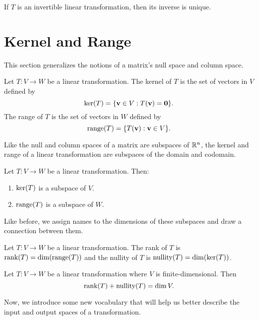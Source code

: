 \documentclass[../m73main.tex]{chapters}
\begin{document}
\begin{theorem}
	If $T$ is an invertible linear transformation, then its inverse is unique.
\end{theorem}

\section{Kernel and Range}
This section generalizes the notions of a matrix's null space and column space.

\begin{definition}
	Let $T : V \to W$ be a linear transformation.
	The kernel of $T$ is the set of vectors in $V$ defined by
	\[ \textrm{ker}(T) = \{\mathbf{v} \in V : T(\mathbf{v}) = \mathbf{0}\}. \]
	The range of $T$ is the set of vectors in $W$ defined by
	\[ \textrm{range}(T) = \{T(\mathbf{v}) : \mathbf{v} \in V\}. \]
\end{definition}

Like the null and column spaces of a matrix are subspaces of $\mathbb{R}^n$, the kernel and range of a linear transformation are subspaces of the domain and codomain.

\begin{theorem}
	Let $T : V \to W$ be a linear transformation.
	Then:
	\begin{enumerate}[label=(\alph*)]
		\item $\textrm{ker}(T)$ is a subspace of $V$.
		\item $\textrm{range}(T)$ is a subspace of $W$.
	\end{enumerate}
\end{theorem}

Like before, we assign names to the dimensions of these subspaces and draw a connection between them.

\begin{definition}
	Let $T : V \to W$ be a linear transformation.
	The rank of $T$ is $\textrm{rank}(T) = \dim (\textrm{range}(T))$ and the nullity of $T$ is $\textrm{nullity}(T) = \dim (\textrm{ker}(T))$.
\end{definition}

\begin{theorem}
	Let $T : V \to W$ be a linear transformation where $V$ is finite-dimensional.
	Then
	\[ \textrm{rank}(T) + \textrm{nullity}(T) = \dim V. \]
\end{theorem}

Now, we introduce some new vocabulary that will help us better describe the input and output spaces of a transformation.
\end{document}
